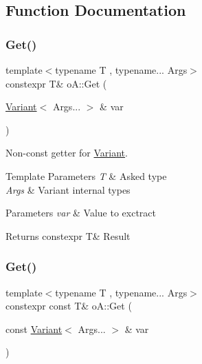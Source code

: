 \subsection{Function Documentation}
\mbox{\label{namespaceo_a_ad005adf81258b6620b273f6b58be4a42}} 
\subsubsection{\texorpdfstring{Get()}{Get()}\hspace{0.1cm}{\footnotesize\ttfamily [1/2]}}
{\footnotesize\ttfamily template$<$typename T , typename... Args$>$ \\
constexpr T\& o\+A\+::\+Get (\begin{DoxyParamCaption}\item[{\mbox{\hyperlink{namespaceo_a_a46a1498e4e673b19327a24fac0018867}{Variant}}$<$ Args... $>$ \&}]{var }\end{DoxyParamCaption})\hspace{0.3cm}{\ttfamily [inline]}}



Non-\/const getter for \mbox{\hyperlink{namespaceo_a_a46a1498e4e673b19327a24fac0018867}{Variant}}. 


\begin{DoxyTemplParams}{Template Parameters}
{\em T} & Asked type \\
\hline
{\em Args} & Variant internal types \\
\hline
\end{DoxyTemplParams}

\begin{DoxyParams}{Parameters}
{\em var} & Value to exctract \\
\hline
\end{DoxyParams}
\begin{DoxyReturn}{Returns}
constexpr T\& Result 
\end{DoxyReturn}
\mbox{\label{namespaceo_a_a1d74fafe5226bbc3bc4bcb41f6f24113}} 
\subsubsection{\texorpdfstring{Get()}{Get()}\hspace{0.1cm}{\footnotesize\ttfamily [2/2]}}
{\footnotesize\ttfamily template$<$typename T , typename... Args$>$ \\
constexpr const T\& o\+A\+::\+Get (\begin{DoxyParamCaption}\item[{const \mbox{\hyperlink{namespaceo_a_a46a1498e4e673b19327a24fac0018867}{Variant}}$<$ Args... $>$ \&}]{var }\end{DoxyParamCaption})\hspace{0.3cm}{\ttfamily [inline]}}



